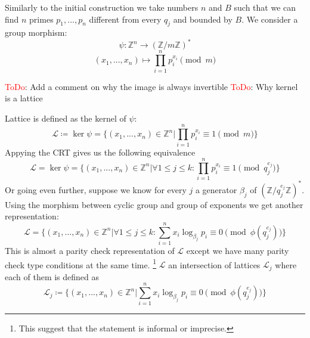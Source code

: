 \documentclass[12pt]{article}
\newcommand{\ZZ}{\mathbb{Z}}
\newcommand{\LL}{\mathcal{L}}
\def\improved{\bgroup \markoverwith{\textcolor{black}{\lower4.5pt\hbox{\sixly \char58}}}\ULon}
\begin{document}
Similarly to the initial construction we take numbers $n$ and $B$ such that we can find $n$ primes $p_{1}, ... , p_{n}$ different from every $q_{j}$ and bounded by $B$. We consider a group morphism:
\begin{equation}
    \psi : \ZZ^{n} \rightarrow (\ZZ/m\ZZ)^*
\end{equation}
\begin{equation}
    (x_{1}, ..., x_{n}) \mapsto \prod_{i=1}^{n}p_{i}^{x_{i}} \pmod{m}
\end{equation}

\textcolor{red}{ToDo}: Add a comment on why the image is always invertible
\textcolor{red}{ToDo}: Why kernel is a lattice

Lattice is defined as the kernel of $\psi$:
\begin{equation}
    \LL \coloneqq \ker \psi = \{(x_{1}, ..., x_{n}) \in \ZZ^{n} | \prod_{i=1}^{n}p_{i}^{x_{i}} \equiv 1 \pmod{m}\}
\end{equation}
Appying the CRT gives us the following equivalence
\begin{equation}
    \LL = \ker \psi = \{(x_{1}, ..., x_{n}) \in \ZZ^{n} |  \forall 1 \leq j \leq k: \prod_{i=1}^{n}p_{i}^{x_{i}} \equiv 1 \pmod{q_{j}^{e_{j}}}\}
\end{equation}
Or going even further, suppose we know for every $j$ a generator ${\beta_{j}}$ of  $(\ZZ/q_{j}^{e_{j}}\ZZ)^*$. Using the morphism between cyclic group and group of exponents we get another representation:
\begin{equation}
    \LL = \{(x_{1}, ..., x_{n}) \in \ZZ^{n} |  \forall 1 \leq j \leq k: \sum_{i=1}^{n}x_{i}\log_{\beta_{j}}p_{i}\equiv 0 \pmod{\phi(q_{j}^{e_{j}})}\}
\end{equation}
This is almost a parity check representation of $\LL$ except we have many parity check type conditions at the same time. \improved{Therefore, }\footnote{This suggest that the statement is informal or imprecise.} $\LL$ \improved{is} an intersection of lattices $\LL_{j}$ where each of them is defined as
\begin{equation}
    \LL_{j} \coloneqq \{(x_{1}, ..., x_{n}) \in \ZZ^{n} | \sum_{i=1}^{n}x_{i}\log_{\beta_{j}}p_{i}\equiv 0 \pmod{\phi(q_{j}^{e_{j}})}\}
\end{equation}
\end{document}
